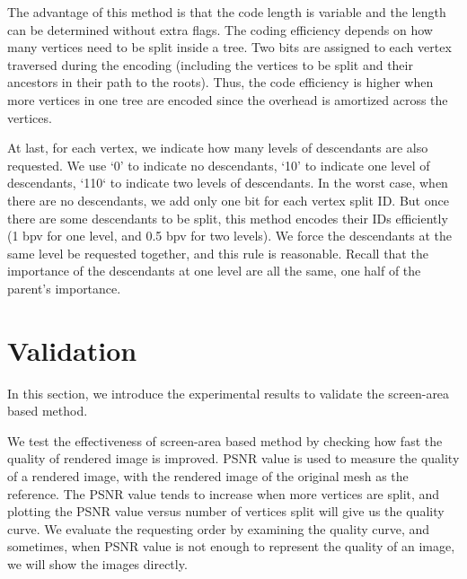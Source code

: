     The advantage of this method is that the code length is variable and the 
    length can be determined without extra flags. The coding efficiency depends
    on how many vertices need to be split inside a tree. Two bits
    are assigned to each vertex traversed during the encoding
    (including the vertices to be split and their ancestors in their path
    to the roots). Thus, the code efficiency is higher when more vertices in one tree
    are encoded since the overhead is amortized across the vertices. 

    At last, for each vertex, we indicate how many levels of descendants are also requested.
    We use `0' to indicate no descendants, `10' to indicate one level of descendants,
    `110` to indicate two levels of descendants. 
    In the worst case, when there are no descendants, we add only one bit for each vertex split
    ID. But once there are some descendants to be split, this method encodes their IDs 
    efficiently (1 bpv for one level, and 0.5 bpv for two levels). 
    We force the descendants at the same level be requested together, and 
    this rule is reasonable. Recall that the importance of the descendants at one level are all the same, 
    one half of the parent's importance.
\section{Validation}
\label{s:dstream:evaluation}
In this section, we introduce the experimental results to 
validate the screen-area based method.

We test the effectiveness of screen-area based method by checking
how fast the quality of rendered image is improved. PSNR value 
is used to measure the quality of a rendered
image, with the rendered image of the original mesh as the reference. 
The PSNR value tends to increase when more vertices are split, 
and plotting the PSNR value versus number of vertices split
will give us the quality curve. 
We evaluate the requesting order by examining the quality
curve, and sometimes, when PSNR value is not enough to 
represent the quality of an image, we will show the images directly.

